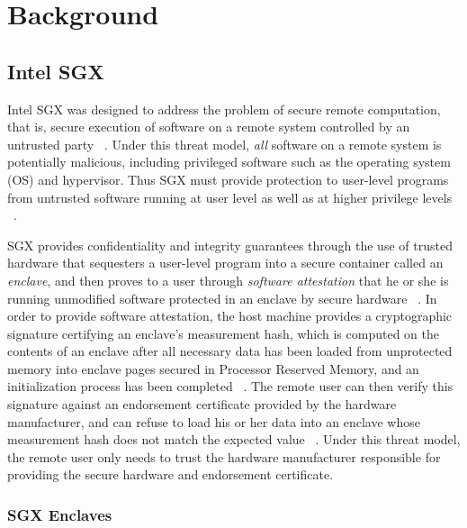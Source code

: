 \section{Background}

\subsection{Intel SGX}

Intel SGX was designed to address the problem of secure remote computation, that is, secure execution of software on a remote system controlled by an untrusted party ~\cite{intel_corporation_intel_2016}. Under this threat model, \emph{all} software on a remote system is potentially malicious, including privileged software such as the operating system (OS) and hypervisor. Thus SGX must provide protection to user-level programs from untrusted software running at user level as well as at higher privilege levels ~\cite{costan_intel_2016}. 

SGX provides confidentiality and integrity guarantees through the use of trusted hardware that sequesters a user-level program into a secure container called an \emph{enclave}, and then proves to a user through \emph{software attestation} that he or she is running unmodified software protected in an enclave by secure hardware ~\cite{intel_corporation_intel_2016}. In order to provide software attestation, the host machine provides a cryptographic signature certifying an enclave's measurement hash, which is computed on the contents of an enclave after all necessary data has been loaded from unprotected memory into enclave pages secured in Processor Reserved Memory, and an initialization process has been completed ~\cite{costan_intel_2016}. The remote user can then verify this signature against an endorsement certificate provided by the hardware manufacturer, and can refuse to load his or her data into an enclave whose measurement hash does not match the expected value ~\cite{intel_corporation_intel_2016, costan_intel_2016}. Under this threat model, the remote user only needs to trust the hardware manufacturer responsible for providing the secure hardware and endorsement certificate.

\subsubsection{SGX Enclaves}

